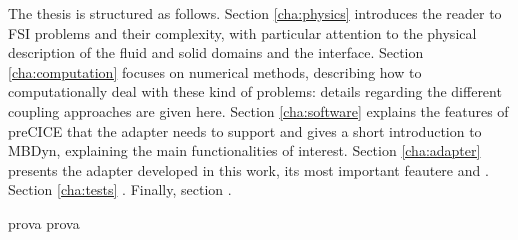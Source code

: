 
The thesis is structured as follows. Section \ref{cha:physics} introduces the reader to FSI problems and their complexity, with particular attention to the physical description of the fluid and solid domains and the interface. 
Section \ref{cha:computation} focuses on numerical methods, describing how to computationally deal with these kind of problems: details regarding the different coupling approaches are given here.
Section \ref{cha:software} explains the features of preCICE that the adapter needs to support and gives a short introduction to MBDyn, explaining the main functionalities of interest.
Section \ref{cha:adapter} presents the adapter developed in this work, its most important feautere and .
Section \ref{cha:tests} .
Finally, section .


prova prova